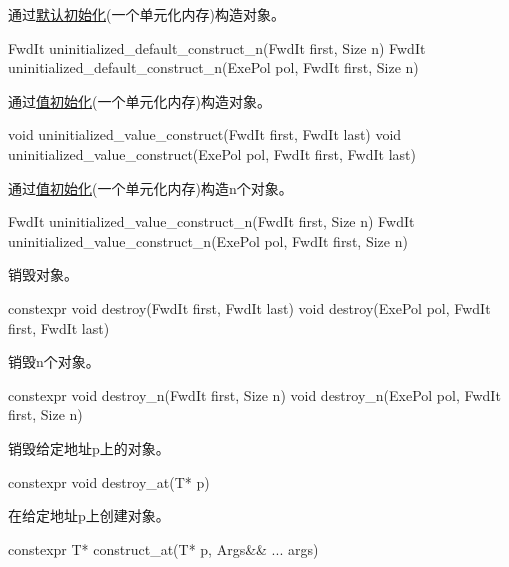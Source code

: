 通过\href{https://en.cppreference.com/w/cpp/language/default_initialization}{默认初始化}(一个单元化内存)构造对象。

\begin{cpp}
FwdIt uninitialized_default_construct_n(FwdIt first, Size n)
FwdIt uninitialized_default_construct_n(ExePol pol, FwdIt first, Size n)
\end{cpp}

通过\href{https://en.cppreference.com/w/cpp/language/value_initialization}{值初始化}(一个单元化内存)构造对象。

\begin{cpp}
void uninitialized_value_construct(FwdIt first, FwdIt last)
void uninitialized_value_construct(ExePol pol, FwdIt first, FwdIt last)
\end{cpp}

通过\href{https://en.cppreference.com/w/cpp/language/value_initialization}{值初始化}(一个单元化内存)构造n个对象。

\begin{cpp}
FwdIt uninitialized_value_construct_n(FwdIt first, Size n)
FwdIt uninitialized_value_construct_n(ExePol pol, FwdIt first, Size n)
\end{cpp}

销毁对象。

\begin{cpp}
constexpr void destroy(FwdIt first, FwdIt last)
void destroy(ExePol pol, FwdIt first, FwdIt last)
\end{cpp}

销毁n个对象。

\begin{cpp}
constexpr void destroy_n(FwdIt first, Size n)
void destroy_n(ExePol pol, FwdIt first, Size n)
\end{cpp}

销毁给定地址p上的对象。

\begin{cpp}
constexpr void destroy_at(T* p)
\end{cpp}

在给定地址p上创建对象。

\begin{cpp}
constexpr T* construct_at(T* p, Args&& ... args)
\end{cpp}













